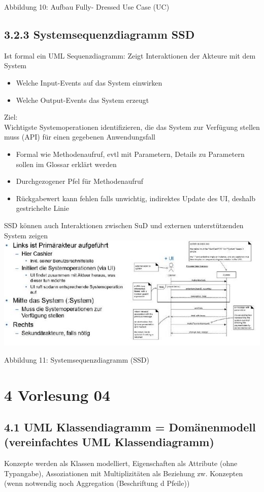 \documentclass[10pt]{article}
\begin{document}
Abbildung 10: Aufbau Fully- Dressed Use Case (UC)

\subsection*{3.2.3 Systemsequenzdiagramm SSD}
Ist formal ein UML Sequenzdiagramm: Zeigt Interaktionen der Akteure mit dem System

\begin{itemize}
  \item Welche Input-Events auf das System einwirken
  \item Welche Output-Events das System erzeugt
\end{itemize}

Ziel:\\
Wichtigste Systemoperationen identifizieren, die das System zur Verfügung stellen muss (API) für einen gegebenen Anwendungsfall

\begin{itemize}
  \item Formal wie Methodenaufruf, evtl mit Parametern, Details zu Parametern sollen im Glossar erklärt werden
  \item Durchgezogener Pfel für Methodenaufruf
  \item Rückgabewert kann fehlen falls unwichtig, indirektes Update des UI, deshalb gestrichelte Linie
\end{itemize}

SSD können auch Interaktionen zwischen SuD und externen unterstützenden System zeigen\\
\includegraphics[width=\linewidth]{images/2024_12_29_0d1d7b5551ea1b4b41bdg-06}

Abbildung 11: Systemsequenzdiagramm (SSD)

\section*{4 Vorlesung 04}
\subsection*{4.1 UML Klassendiagramm = Domänenmodell (vereinfachtes UML Klassendiagramm)}
Konzepte werden als Klassen modelliert, Eigenschaften als Attribute (ohne Typangabe), Assoziationen mit Multiplizitäten als Beziehung zw. Konzepten (wenn notwendig noch Aggregation (Beschriftung d Pfeile))
\end{document}

